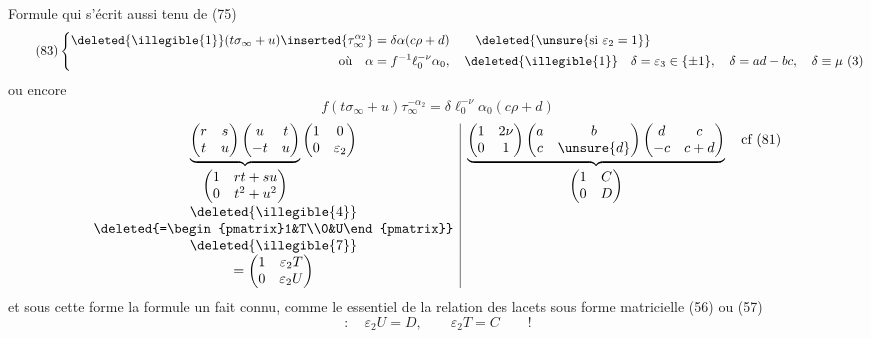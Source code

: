 Formule qui s'écrit aussi
   tenu de (75)
\[
\tag{83}
\left\{\begin{aligned}
\deleted{\illegible{1}}(t\sigma_\infty+u)\inserted{\tau_\infty^{\alpha_2}}
&=\delta\alpha(c\rho+d)
\qquad\deleted{\unsure{\text{si }\varepsilon_2=1}}\\
\text{où}\quad\alpha&=f^{-1}\ell_0^{-\nu}\alpha_0,
\quad\deleted{\illegible{1}}\quad
\delta=\varepsilon_3\in\{\pm1\},\quad\delta=ad-bc,\quad\delta\equiv\mu\ (3)
\end{aligned}\right.
\]
ou encore
\[
\tag{84}
f(t\sigma_\infty+u)\tau_\infty^{-\alpha_2}
=\delta\ell_0^{-\nu}\alpha_0(c\rho+d)
\]
\[
\begin{array}{c|c}
\underbrace{
\begin{pmatrix}r&s\\t&u\end{pmatrix}
\begin{pmatrix}u&t\\-t&u\end{pmatrix}
}_{\displaystyle\begin{pmatrix}1&rt+su\\0&t^2+u^2\end{pmatrix}}
\begin{pmatrix}1&0\\0&\varepsilon_2\end{pmatrix}
&
\underbrace{
\begin{pmatrix}1&2\nu\\0&1\end{pmatrix}
\begin{pmatrix}a&b\\c&\unsure{d}\end{pmatrix}
\begin{pmatrix}d&c\\-c&c+d\end{pmatrix}
}_{\displaystyle\begin{pmatrix}1&C\\0&D\end{pmatrix}}
\quad\text{cf (81)}\\
\deleted{\illegible{4}}&\\
\deleted{=\begin{pmatrix}1&T\\0&U\end{pmatrix}}&\\
\deleted{\illegible{7}}&\\
=\begin{pmatrix}1&\varepsilon_2T\\0&\varepsilon_2U\end{pmatrix}&
\end{array}
\]
et sous cette forme la formule  un fait connu,
comme le  essentiel de la  relation des lacets sous forme matricielle (56) ou (57)
\[
:\quad\varepsilon_2U=D,\qquad\varepsilon_2T=C\qquad!
\]

